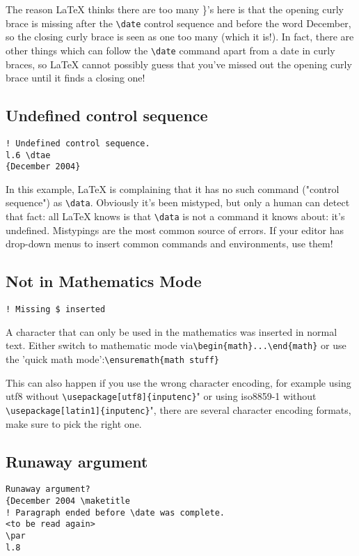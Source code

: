 The reason LaTeX thinks there are too many \}'s here is that the opening curly
brace is missing after the \verb|\date| control sequence and before the word
December, so the closing curly brace is seen as one too many (which it is!). In
fact, there are other things which can follow the \verb|\date| command apart
from a date in curly braces, so LaTeX cannot possibly guess that you've missed
out the opening curly brace until it finds a closing one!

\subsection{Undefined control sequence}


\begin{verbatim}
! Undefined control sequence.
l.6 \dtae
{December 2004}

\end{verbatim}

In this example, LaTeX is complaining that it has no such command ("control
sequence") as \verb|\data|. Obviously it's been mistyped, but only a human
can detect that fact: all LaTeX knows is that \verb|\data| is not a command
it knows about: it's undefined. Mistypings are the most common source of
errors. If your editor has drop-down menus to insert common commands and
environments, use them!

\subsection{Not in Mathematics Mode}
\begin{verbatim}
! Missing $ inserted
\end{verbatim}

A character that can only be used in the mathematics was inserted in normal
text. Either switch to mathematic mode via\verb|\begin{math}...\end{math}| or
use the 'quick math mode':\verb|\ensuremath{math stuff}|

This can also happen if you use the wrong character encoding, for example using
utf8 without \verb|\usepackage[utf8]{inputenc}|" or using iso8859-1 without
\verb|\usepackage[latin1]{inputenc}|", there are several character encoding
formats, make sure to pick the right one.

\subsection{Runaway argument}
\begin{verbatim}
Runaway argument?
{December 2004 \maketitle
! Paragraph ended before \date was complete.
<to be read again>
\par
l.8

\end{verbatim}

